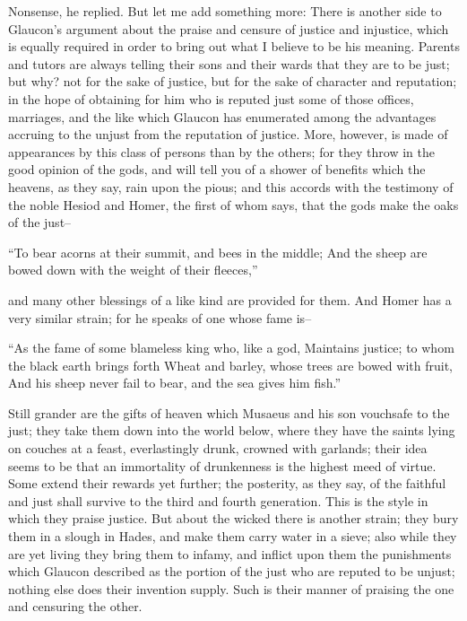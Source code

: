 Nonsense, he replied. But let me add something more: There is another
side to Glaucon's argument about the praise and censure of justice
and injustice, which is equally required in order to bring out what I
believe to be his meaning. Parents and tutors are always telling their
sons and their wards that they are to be just; but why? not for the sake
of justice, but for the sake of character and reputation; in the hope of
obtaining for him who is reputed just some of those offices, marriages,
and the like which Glaucon has enumerated among the advantages accruing
to the unjust from the reputation of justice. More, however, is made of
appearances by this class of persons than by the others; for they
throw in the good opinion of the gods, and will tell you of a shower of
benefits which the heavens, as they say, rain upon the pious; and this
accords with the testimony of the noble Hesiod and Homer, the first of
whom says, that the gods make the oaks of the just--

   ``To bear acorns at their summit, and bees in the middle;
   And the sheep are bowed down with the weight of their fleeces,''

and many other blessings of a like kind are provided for them. And Homer
has a very similar strain; for he speaks of one whose fame is--

``As the fame of some blameless king who, like a god, Maintains justice;
to whom the black earth brings forth Wheat and barley, whose trees are
bowed with fruit, And his sheep never fail to bear, and the sea gives
him fish.''

Still grander are the gifts of heaven which Musaeus and his son
vouchsafe to the just; they take them down into the world below, where
they have the saints lying on couches at a feast, everlastingly drunk,
crowned with garlands; their idea seems to be that an immortality of
drunkenness is the highest meed of virtue. Some extend their rewards
yet further; the posterity, as they say, of the faithful and just shall
survive to the third and fourth generation. This is the style in which
they praise justice. But about the wicked there is another strain; they
bury them in a slough in Hades, and make them carry water in a sieve;
also while they are yet living they bring them to infamy, and inflict
upon them the punishments which Glaucon described as the portion of the
just who are reputed to be unjust; nothing else does their invention
supply. Such is their manner of praising the one and censuring the
other.


